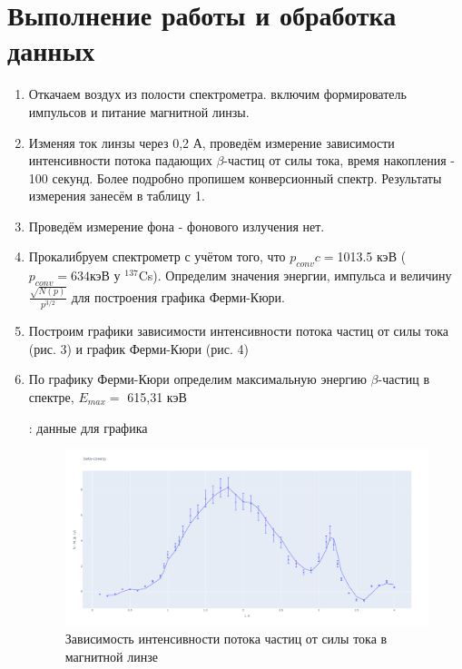 \documentclass[15pt,a5paper,reqno]{article}
\begin{document}
\section{Выполнение работы и обработка данных}

\begin{enumerate}
    \item Откачаем воздух из полости спектрометра. включим формирователь импульсов и питание магнитной линзы.
    \item Изменяя ток линзы через 0,2 А, проведём измерение зависимости интенсивности потока падающих $\beta$-частиц от силы тока, время накопления - 100 секунд. Более подробно пропишем конверсионный спектр. Результаты измерения занесём в таблицу 1.
    \item Проведём измерение фона - фонового излучения нет.
    \item Прокалибруем спектрометр с учётом того, что $p_{conv}c = $1013.5 кэВ ($p_{conv} = 634 $кэВ у $^{137}$Cs). Определим значения энергии, импульса и величину $\frac{\sqrt{N(p)}}{p^{3/2}}$ для построения графика Ферми-Кюри.
    \item Построим графики зависимости интенсивности потока частиц от силы тока (рис. 3) и график Ферми-Кюри (рис. 4)
    
    \item По графику Ферми-Кюри определим максимальную энергию $\beta$-частиц в спектре, $E_{max} = $ 615,31 кэВ

  
    
\begin{table}[h!]
  \centering
  
  \caption{: данные для графика}
\label{tb2}
\end{table}


\begin{figure}[h!]
			\centering
			\includegraphics[width=\linewidth]{pics/lab_542_1.png}
			\caption{Зависимость интенсивности потока частиц от силы тока в магнитной линзе}
		\end{figure}
		

\end{enumerate}
\end{document}
